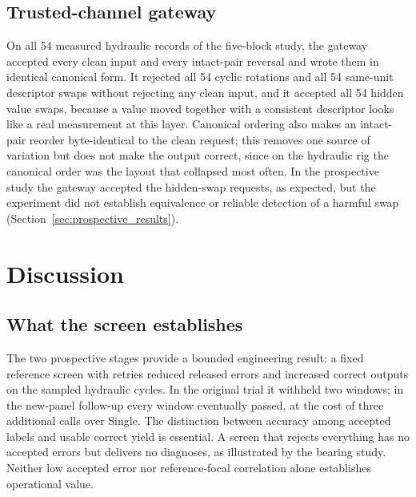 \documentclass[11pt,a4paper]{article}
\begin{document}
\subsection{Trusted-channel gateway}
On all 54 measured hydraulic records of the five-block study, the gateway accepted every clean input and every intact-pair reversal and wrote them in identical canonical form. It rejected all 54 cyclic rotations and all 54 same-unit descriptor swaps without rejecting any clean input, and it accepted all 54 hidden value swaps, because a value moved together with a consistent descriptor looks like a real measurement at this layer. Canonical ordering also makes an intact-pair reorder byte-identical to the clean request; this removes one source of variation but does not make the output correct, since on the hydraulic rig the canonical order was the layout that collapsed most often. In the prospective study the gateway accepted the hidden-swap requests, as expected, but the experiment did not establish equivalence or reliable detection of a harmful swap (Section~\ref{sec:prospective_results}).

\section{Discussion}\label{sec:discussion}
\subsection{What the screen establishes}
The two prospective stages provide a bounded engineering result: a fixed reference screen with retries reduced released errors and increased correct outputs on the sampled hydraulic cycles. In the original trial it withheld two windows; in the new-panel follow-up every window eventually passed, at the cost of three additional calls over Single. The distinction between accuracy among accepted labels and usable correct yield is essential. A screen that rejects everything has no accepted errors but delivers no diagnoses, as illustrated by the bearing study. Neither low accepted error nor reference-focal correlation alone establishes operational value.
\end{document}
